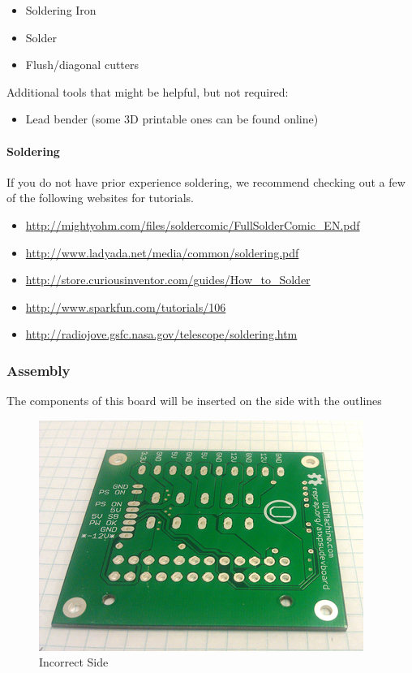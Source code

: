 \begin{itemize}
\itemsep1pt\parskip0pt
\item
  Soldering Iron
\item
  Solder
\item
  Flush/diagonal cutters
\end{itemize}

Additional tools that might be helpful, but not required:

\begin{itemize}
\itemsep1pt\parskip0pt
\item
  Lead bender (some 3D printable ones can be found online)
\end{itemize}

\paragraph{Soldering}

If you do not have prior experience soldering, we recommend checking out
a few of the following websites for tutorials.

\begin{itemize}
\itemsep1pt\parskip0pt
\item
  \url{http://mightyohm.com/files/soldercomic/FullSolderComic_EN.pdf}
\item
  \url{http://www.ladyada.net/media/common/soldering.pdf}
\item
  \url{http://store.curiousinventor.com/guides/How_to_Solder}
\item
  \url{http://www.sparkfun.com/tutorials/106}
\item
  \url{http://radiojove.gsfc.nasa.gov/telescope/soldering.htm}
\end{itemize}

\subsubsection{Assembly}

The components of this board will be inserted on the side with the
outlines

\begin{figure}[H]
\centering
\includegraphics{./png/incorrect-side.png}
\caption{Incorrect Side}
\end{figure}

